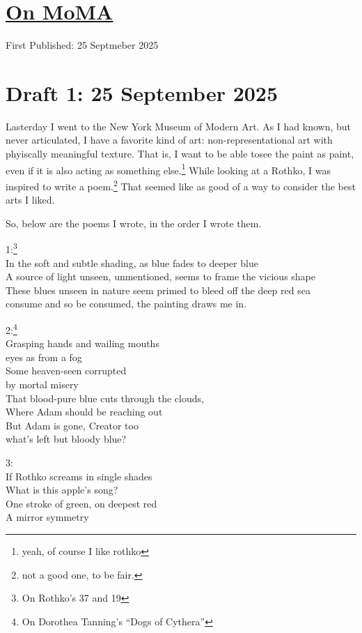 \documentclass[12pt]{article}
\newcommand{\say}[1]{``#1''}
\renewcommand{\,}{\textsuperscript{,}}
\begin{document}
  
\doublespacing  
\section{\href{moma.html}{On MoMA}}  
First Published: 25 Septmeber 2025
\section{Draft 1: 25 September 2025}
Lasterday I went to the New York Museum of Modern Art.
As I had known, but never articulated, I have a favorite kind of art: non-representational art with phyiscally meaningful texture.
That is, I want to be able tosee the paint as paint, even if it is also acting as something else.\footnote{yeah, of course I like rothko}
While looking at a Rothko, I was inspired to write a poem.\footnote{not a good one, to be fair.}
That seemed like as good of a way to consider the best arts I liked.

So, below are the poems I wrote, in the order I wrote them.

1:\footnote{On Rothko's 37 and 19}\\
In the soft and subtle shading, as blue fades to deeper blue\\
A source of light unseen, unmentioned, seems to frame the vicious shape\\
These blues unseen in nature seem primed to bleed off the deep red sea\\
consume and so be consumed, the painting draws me in.

2:\footnote{On Dorothea Tanning's \say{Dogs of Cythera}}\\
Grasping hands and wailing mouths\\
eyes as from a fog\\
Some heaven-seen corrupted\\
by mortal misery\\
That blood-pure blue cuts through the clouds,\\
Where Adam should be reaching out\\
But Adam is gone, Creator too\\
what's left but bloody blue?

3:\\
If Rothko screams in single shades\\
What is this apple's song?\\
One stroke of green, on deepest red\\
A mirror symmetry
\end{document}
